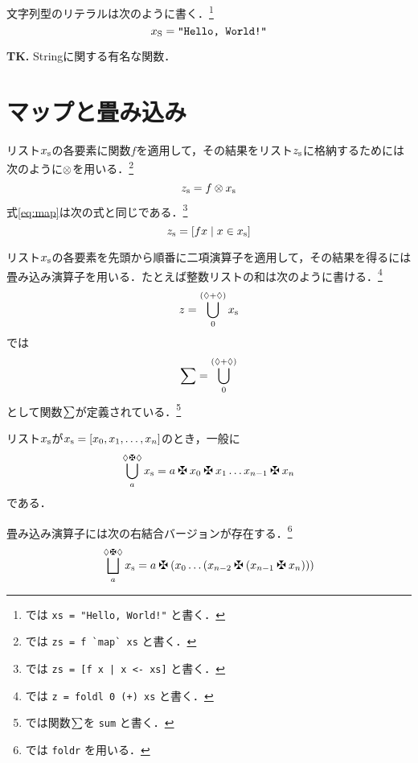 \documentclass[platex,a5paper,twoside,fleqn,draft]{jsbook}
\newcommand{\keyword}[1]{\textgt{\textbf{#1}}}
\newcommand{\tobewritten}[1]{\begin{screen}\textbf{TK.} {#1}\end{screen}}
\begin{document}
文字列型のリテラルは次のように書く．\footnote{\haskell では \verb|xs = "Hello, World!"| と書く．}
\begin{equation}
{x}_\mathrm{S}=\mathord{\texttt{"Hello, World!"}}
\end{equation}

\tobewritten{Stringに関する有名な関数．}

\section{マップと畳み込み}

リスト${x}_\mathrm{s}$の各要素に関数$f$を適用して，その結果をリスト${z}_\mathrm{s}$に格納するためには次のように\keyword{マップ演算子}$\otimes$を用いる．\footnote{\haskell では \verb|zs = f `map` xs| と書く．}
\begin{equation}
{z}_\mathrm{s}=f\otimes{x}_\mathrm{s}
\label{eq:map}
\end{equation}
式\eqref{eq:map}は次の式と同じである．\footnote{\haskell では \verb/zs = [f x | x <- xs]/ と書く．}
\begin{equation}
{z}_\mathrm{s}=\left[fx\mid x\in{x}_\mathrm{s}\right]
\end{equation}

リスト${x}_\mathrm{s}$の各要素を先頭から順番に二項演算子を適用して，その結果を得るには畳み込み演算子を用いる．たとえば整数リストの和は次のように書ける．\footnote{\haskell では \verb|z = foldl 0 (+) xs| と書く．}
\begin{equation}
z=\bigcup_{0}^{(\mathord{\lozenge}+\mathord{\lozenge})}{x}_\mathrm{s}
\end{equation}
\haskell では
\begin{equation}
\sum=\bigcup_{0}^{(\mathord{\lozenge}+\mathord{\lozenge})}
\end{equation}
として関数$\sum$が定義されている．\footnote{\haskell では関数$\sum$を \verb|sum| と書く．}

リスト${x}_\mathrm{s}$が${x}_\mathrm{s}=[x_0,x_1,\dots,x_n]$のとき，一般に
\begin{equation}
\mathFold{a}{\mathAnonymousParameter\mathAnonymousOperator\mathAnonymousParameter}{\mathList{x}}
=a\mathAnonymousOperator x_0\mathAnonymousOperator x_1\dots x_{n-1}\mathAnonymousOperator x_n
\end{equation}
である．

畳み込み演算子には次の右結合バージョンが存在する．\footnote{\haskell では \verb|foldr| を用いる．}
\begin{equation}
\mathFoldRight{a}{\mathAnonymousParameter\mathAnonymousOperator\mathAnonymousParameter}{\mathList{x}}
=a\mathAnonymousOperator\left(x_0\dots\left(x_{n-2}\mathAnonymousOperator\left(x_{n-1}\mathAnonymousOperator x_n\right)\right)\right)
\end{equation}
\end{document}
